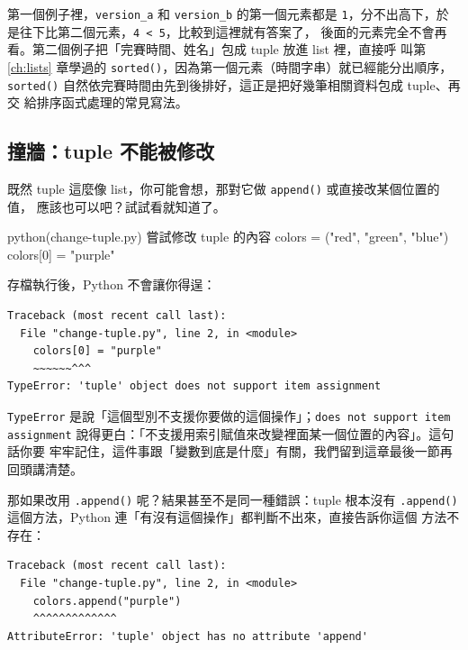 
第一個例子裡，\texttt{version\_a} 和 \texttt{version\_b} 的第一個元素都是
\texttt{1}，分不出高下，於是往下比第二個元素，\texttt{4 < 5}，比較到這裡就有答案了，
後面的元素完全不會再看。第二個例子把「完賽時間、姓名」包成 tuple 放進 list 裡，直接呼
叫第 \ref{ch:lists} 章學過的 \texttt{sorted()}，因為第一個元素（時間字串）就已經能分出順序，
\texttt{sorted()} 自然依完賽時間由先到後排好，這正是把好幾筆相關資料包成 tuple、再交
給排序函式處理的常見寫法。


\subsection*{撞牆：tuple 不能被修改}

既然 tuple 這麼像 list，你可能會想，那對它做 \texttt{append()} 或直接改某個位置的值，
應該也可以吧？試試看就知道了。

\begin{example}{python}{(change-tuple.py) 嘗試修改 tuple 的內容}
colors = ("red", "green", "blue")
colors[0] = "purple"
\end{example}

存檔執行後，Python 不會讓你得逞：

\begin{verbatim}
Traceback (most recent call last):
  File "change-tuple.py", line 2, in <module>
    colors[0] = "purple"
    ~~~~~~^^^
TypeError: 'tuple' object does not support item assignment
\end{verbatim}

\texttt{TypeError} 是說「這個型別不支援你要做的這個操作」；\texttt{does not support
item assignment} 說得更白：「不支援用索引賦值來改變裡面某一個位置的內容」。這句話你要
牢牢記住，這件事跟「變數到底是什麼」有關，我們留到這章最後一節再回頭講清楚。

那如果改用 \texttt{.append()} 呢？結果甚至不是同一種錯誤：tuple 根本沒有
\texttt{.append()} 這個方法，Python 連「有沒有這個操作」都判斷不出來，直接告訴你這個
方法不存在：

\begin{verbatim}
Traceback (most recent call last):
  File "change-tuple.py", line 2, in <module>
    colors.append("purple")
    ^^^^^^^^^^^^^
AttributeError: 'tuple' object has no attribute 'append'
\end{verbatim}

